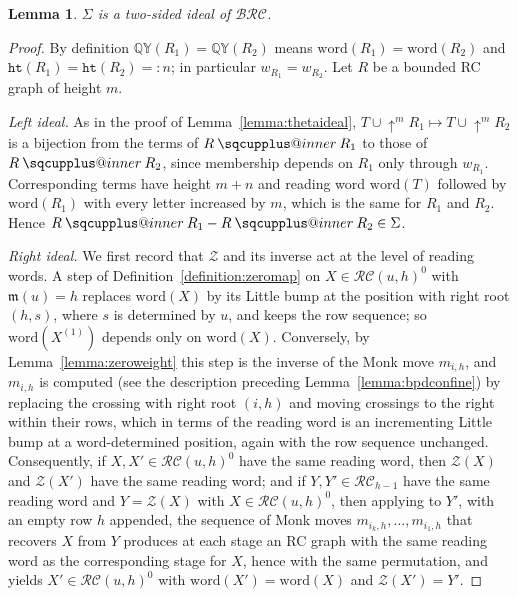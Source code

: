 \documentclass{amsart}
\makeatletter
\newcommand{\sqcupplus@inner}[2]{%
  \vcenter{\hbox{\ooalign{%
    \hfil$\m@th#1\sqcup$\hfil\cr
    \hfil\raisebox{0.15ex}{$\m@th#1\scriptscriptstyle+$}\hfil\cr
  }}}%
}
\newcommand{\sqcupplus}{\mathbin{\mathpalette\sqcupplus@inner\relax}}
\newtheorem{lemma}{Lemma}[subsection]
\theoremstyle{definition}
\theoremstyle{remark}
\numberwithin{equation}{subsection}
\newcommand{\shup}{{\uparrow}}
\newcommand{\wof}[1]{w_{#1}}
\newcommand{\QY}{\ensuremath{\mathbb{QY}}}
\newcommand{\zeromap}{\mathcal{Z}}
\newcommand{\hr}{\mathtt{ht}}
\newcommand{\BRC}{\mathcal{BRC}}
\newcommand{\RC}{\mathcal{RC}}
\newcommand{\maxd}{\mathfrak{m}}
\makeatother
\begin{document}
\begin{lemma}\label{lemma:slideideal}
$\Sigma$ is a two-sided ideal of $\BRC$.
\end{lemma}
\begin{proof}
By definition $\QY(R_1)=\QY(R_2)$ means $\mathrm{word}(R_1)=\mathrm{word}(R_2)$ and $\hr(R_1)=\hr(R_2)=:n$; in particular $\wof{R_1}=\wof{R_2}$. Let $R$ be a bounded RC graph of height $m$.

\emph{Left ideal.} As in the proof of Lemma~\ref{lemma:thetaideal}, $T\cup\shup^mR_1\mapsto T\cup\shup^mR_2$ is a bijection from the terms of $R\sqcupplus R_1$ to those of $R\sqcupplus R_2$, since membership depends on $R_1$ only through $\wof{R_1}$. Corresponding terms have height $m+n$ and reading word $\mathrm{word}(T)$ followed by $\mathrm{word}(R_1)$ with every letter increased by $m$, which is the same for $R_1$ and $R_2$. Hence $R\sqcupplus R_1-R\sqcupplus R_2\in\Sigma$.

\emph{Right ideal.} We first record that $\zeromap$ and its inverse act at the level of reading words. A step of Definition~\ref{definition:zeromap} on $X\in\RC(u,h)^0$ with $\maxd(u)=h$ replaces $\mathrm{word}(X)$ by its Little bump at the position with right root $(h,s)$, where $s$ is determined by $u$, and keeps the row sequence; so $\mathrm{word}(X^{(1)})$ depends only on $\mathrm{word}(X)$. Conversely, by Lemma~\ref{lemma:zeroweight} this step is the inverse of the Monk move $m_{i,h}$, and $m_{i,h}$ is computed (see the description preceding Lemma~\ref{lemma:bpdconfine}) by replacing the crossing with right root $(i,h)$ and moving crossings to the right within their rows, which in terms of the reading word is an incrementing Little bump at a word-determined position, again with the row sequence unchanged. Consequently, if $X,X'\in\RC(u,h)^0$ have the same reading word, then $\zeromap(X)$ and $\zeromap(X')$ have the same reading word; and if $Y,Y'\in\RC_{h-1}$ have the same reading word and $Y=\zeromap(X)$ with $X\in\RC(u,h)^0$, then applying to $Y'$, with an empty row $h$ appended, the sequence of Monk moves $m_{i_k,h},\ldots,m_{i_1,h}$ that recovers $X$ from $Y$ produces at each stage an RC graph with the same reading word as the corresponding stage for $X$, hence with the same permutation, and yields $X'\in\RC(u,h)^0$ with $\mathrm{word}(X')=\mathrm{word}(X)$ and $\zeromap(X')=Y'$.


\end{proof}
\end{document}
